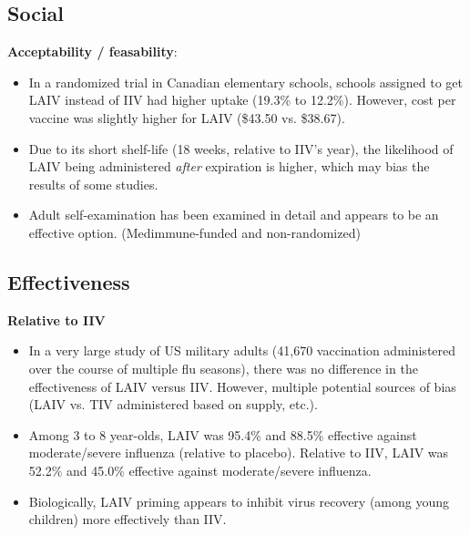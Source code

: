 \documentclass[11pt]{article}
\begin{document}
\begin{multicols}{2}
\subsection*{Social}

\textbf{Acceptability / feasability}:
\begin{itemize}
\item In a randomized trial in Canadian elementary schools, schools assigned to get LAIV instead of IIV had higher uptake (19.3\% to 12.2\%). However, cost per vaccine was slightly higher for LAIV (\$43.50 vs. \$38.67). \cite{Kwong2015}
\item Due to its short shelf-life (18 weeks, relative to IIV's year), the likelihood of LAIV being administered \emph{after} expiration is higher, which may bias the results of some studies. \cite{cdc2014}  
\item Adult self-examination has been examined in detail and appears to be an effective option. \cite{Ambrose2013} (Medimmune-funded and non-randomized)
\end{itemize}

\subsection*{Effectiveness}

\textbf{Relative to IIV}
\begin{itemize}
\item In a very large study of US military adults (41,670 vaccination administered over the course of multiple flu seasons), there was no difference in the effectiveness of LAIV versus IIV. However, multiple potential sources of bias (LAIV vs. TIV administered based on supply, etc.). \cite{Phillips2012} 
\item Among 3 to 8 year-olds, LAIV was 95.4\% and 88.5\% effective against moderate/severe influenza (relative to placebo).  Relative to IIV, LAIV was 52.2\% and 45.0\% effective against moderate/severe influenza. \cite{Ambrose2014}
\item Biologically, LAIV priming appears to inhibit virus recovery (among young children) more effectively than IIV. \cite{Ilyushina2014}
\end{itemize}


\end{multicols}
\end{document}
